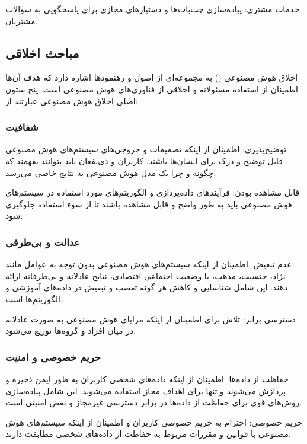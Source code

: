\documentclass[a4paper, titlepage]{article}
\begin{document}
خدمات مشتری: پیاده‌سازی چت‌بات‌ها و دستیارهای مجازی برای پاسخگویی به سوالات مشتریان.

\subsection{مباحث اخلاقی}

اخلاق هوش مصنوعی () به مجموعه‌ای از اصول و رهنمودها اشاره دارد که هدف آن‌ها اطمینان از استفاده مسئولانه و اخلاقی از فناوری‌های هوش مصنوعی است. پنج ستون اصلی اخلاق هوش مصنوعی عبارتند از:

\subsubsection{شفافیت}

توضیح‌پذیری: اطمینان از اینکه تصمیمات و خروجی‌های سیستم‌های هوش مصنوعی قابل توضیح و درک برای انسان‌ها باشند. کاربران و ذی‌نفعان باید بتوانند بفهمند که چگونه و چرا یک مدل هوش مصنوعی به نتایج خاصی می‌رسد.

قابل مشاهده بودن: فرآیندهای داده‌پردازی و الگوریتم‌های مورد استفاده در سیستم‌های هوش مصنوعی باید به طور واضح و قابل مشاهده باشند تا از سوء استفاده جلوگیری شود.

\subsubsection{عدالت و بی‌طرفی}

عدم تبعیض: اطمینان از اینکه سیستم‌های هوش مصنوعی بدون توجه به عوامل مانند نژاد، جنسیت، مذهب، یا وضعیت اجتماعی-اقتصادی، نتایج عادلانه و بی‌طرفانه ارائه دهند. این شامل شناسایی و کاهش هر گونه تعصب و تبعیض در داده‌های آموزشی و الگوریتم‌ها است.

دسترسی برابر: تلاش برای اطمینان از اینکه مزایای هوش مصنوعی به صورت عادلانه در میان افراد و گروه‌ها توزیع می‌شود.

\subsubsection{حریم خصوصی و امنیت}

حفاظت از داده‌ها: اطمینان از اینکه داده‌های شخصی کاربران به طور ایمن ذخیره و پردازش می‌شوند و تنها برای اهداف مجاز استفاده می‌شوند. این شامل پیاده‌سازی روش‌های قوی برای حفاظت از داده‌ها در برابر دسترسی غیرمجاز و نقض امنیتی است.

حریم خصوصی: احترام به حریم خصوصی کاربران و اطمینان از اینکه سیستم‌های هوش مصنوعی با قوانین و مقررات مربوط به حفاظت از داده‌های شخصی مطابقت دارند.
\end{document}
